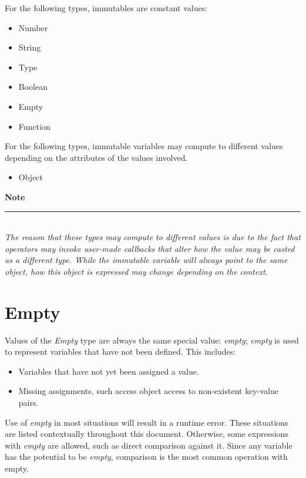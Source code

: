 \documentclass[12pt,letterpaper]{report}
\newcommand{\noteline}{\noindent\textbf{Note}\\\noindent\rule{5cm}{0.4pt}\\}
\begin{document}
For the following types, immutables are constant values:
\begin{itemize}
  \item Number 
  \item String 
  \item Type
  \item Boolean
  \item Empty 
  \item Function  
\end{itemize}

For the following types, immutable variables may compute to different values depending on the attributes of the values involved.
\begin{itemize}
  \item Object 
\end{itemize}



\noteline
\textit{
The reason that these types may compute to different values is due to the fact that operators may invoke user-made callbacks that 
alter how the value may be casted as a different type. While the immutable variable will always point to 
the same object, how this object is expressed may change depending on the context.
}






\section{Empty}\label{Empty}

Values of the \textit{Empty} type are always the same special value: \textit{empty};
\textit{empty} is used to represent variables that have not been defined. This includes:

\begin{itemize}
  \item Variables that have not yet been assigned a value.
  \item Missing assignments, such access object access to non-existent key-value pairs.
\end{itemize}

Use of \textit{empty} in most situations will result in a runtime error. These situations 
are listed contextually throughout this document. Otherwise, some expressions with 
\textit{empty} are allowed, such as direct comparison against it. Since any variable 
has the potential to be \textit{empty}, comparison is the most common operation with 
empty.
\end{document}
